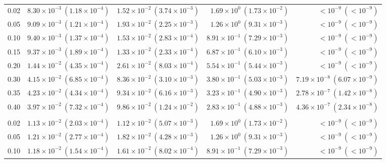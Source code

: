 \begin{table}[htbp]
\begin{tabular}{@{} l rrrr @{}}
0.02 & $8.30\!\times\!10^{-3}\ (1.18\!\times\!10^{-4})$ & $1.52\!\times\!10^{-2}\ (3.74\!\times\!10^{-3})$ & $1.69\!\times\!10^{0}\ (1.73\!\times\!10^{-2})$ & $<\!10^{-9}\ (<\!10^{-9})$ \\
0.05 & $9.09\!\times\!10^{-3}\ (1.21\!\times\!10^{-4})$ & $1.93\!\times\!10^{-2}\ (2.25\!\times\!10^{-3})$ & $1.26\!\times\!10^{0}\ (9.31\!\times\!10^{-3})$ & $<\!10^{-9}\ (<\!10^{-9})$ \\
0.10 & $9.40\!\times\!10^{-3}\ (1.37\!\times\!10^{-4})$ & $1.53\!\times\!10^{-2}\ (2.83\!\times\!10^{-4})$ & $8.91\!\times\!10^{-1}\ (7.29\!\times\!10^{-3})$ & $<\!10^{-9}\ (<\!10^{-9})$ \\
0.15 & $9.37\!\times\!10^{-3}\ (1.89\!\times\!10^{-4})$ & $1.33\!\times\!10^{-2}\ (2.33\!\times\!10^{-4})$ & $6.87\!\times\!10^{-1}\ (6.10\!\times\!10^{-3})$ & $<\!10^{-9}\ (<\!10^{-9})$ \\
0.20 & $1.44\!\times\!10^{-2}\ (4.35\!\times\!10^{-4})$ & $2.61\!\times\!10^{-2}\ (8.03\!\times\!10^{-4})$ & $5.54\!\times\!10^{-1}\ (5.44\!\times\!10^{-3})$ & $<\!10^{-9}\ (<\!10^{-9})$ \\
0.30 & $4.15\!\times\!10^{-2}\ (6.85\!\times\!10^{-4})$ & $8.36\!\times\!10^{-2}\ (3.10\!\times\!10^{-3})$ & $3.80\!\times\!10^{-1}\ (5.03\!\times\!10^{-3})$ & $7.19\!\times\!10^{-8}\ (6.07\!\times\!10^{-9})$ \\
0.35 & $4.23\!\times\!10^{-2}\ (4.34\!\times\!10^{-4})$ & $9.34\!\times\!10^{-2}\ (6.16\!\times\!10^{-3})$ & $3.23\!\times\!10^{-1}\ (4.90\!\times\!10^{-3})$ & $2.78\!\times\!10^{-7}\ (1.42\!\times\!10^{-8})$ \\
0.40 & $3.97\!\times\!10^{-2}\ (7.32\!\times\!10^{-4})$ & $9.86\!\times\!10^{-2}\ (1.24\!\times\!10^{-2})$ & $2.83\!\times\!10^{-1}\ (4.88\!\times\!10^{-3})$ & $4.36\!\times\!10^{-7}\ (2.34\!\times\!10^{-8})$ \\
\addlinespace
\multicolumn{5}{@{}l}{\textit{Wide ($p \sim \mathcal{U}(0.05, 0.30)$)}} \\
0.02 & $1.13\!\times\!10^{-2}\ (2.03\!\times\!10^{-4})$ & $1.12\!\times\!10^{-2}\ (5.07\!\times\!10^{-3})$ & $1.69\!\times\!10^{0}\ (1.73\!\times\!10^{-2})$ & $<\!10^{-9}\ (<\!10^{-9})$ \\
0.05 & $1.21\!\times\!10^{-2}\ (2.77\!\times\!10^{-4})$ & $1.82\!\times\!10^{-2}\ (4.28\!\times\!10^{-3})$ & $1.26\!\times\!10^{0}\ (9.31\!\times\!10^{-3})$ & $<\!10^{-9}\ (<\!10^{-9})$ \\
0.10 & $1.18\!\times\!10^{-2}\ (1.54\!\times\!10^{-4})$ & $1.61\!\times\!10^{-2}\ (8.02\!\times\!10^{-4})$ & $8.91\!\times\!10^{-1}\ (7.29\!\times\!10^{-3})$ & $<\!10^{-9}\ (<\!10^{-9})$ \\

\end{tabular}
\end{table}
